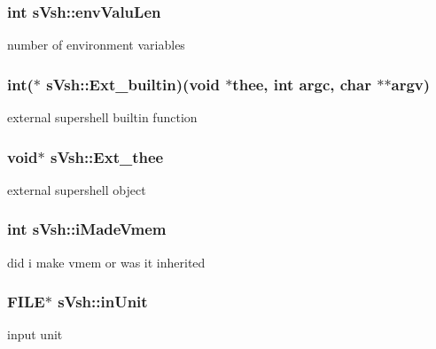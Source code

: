 \subsubsection[{env\-Valu\-Len}]{\setlength{\rightskip}{0pt plus 5cm}int s\-Vsh\-::env\-Valu\-Len}\label{a00007_a6f5d3a3bfe8edef74e14262dca64eb19}


number of environment variables 

\subsubsection[{Ext\-\_\-builtin}]{\setlength{\rightskip}{0pt plus 5cm}int($\ast$ s\-Vsh\-::\-Ext\-\_\-builtin)(void $\ast$thee, int argc, char $\ast$$\ast$argv)}\label{a00007_a1ede7298d7d963598ff09330b4dabf65}


external supershell builtin function 

\subsubsection[{Ext\-\_\-thee}]{\setlength{\rightskip}{0pt plus 5cm}void$\ast$ s\-Vsh\-::\-Ext\-\_\-thee}\label{a00007_aca365034a12a00d62f79aea0e74c24c0}


external supershell object 

\subsubsection[{i\-Made\-Vmem}]{\setlength{\rightskip}{0pt plus 5cm}int s\-Vsh\-::i\-Made\-Vmem}\label{a00007_a4d9333d357f6b00cb9d6a9152835385a}


did i make vmem or was it inherited 

\subsubsection[{in\-Unit}]{\setlength{\rightskip}{0pt plus 5cm}F\-I\-L\-E$\ast$ s\-Vsh\-::in\-Unit}\label{a00007_a71b219a119b8ea2d6a8e8310fff87ad5}


input unit 

